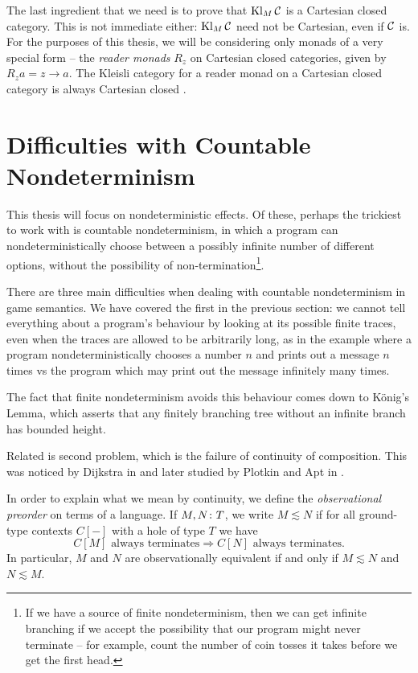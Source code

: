 The last ingredient that we need is to prove that $\operatorname{Kl}_M{\mathcal{C}}$ is a Cartesian closed category.  
This is not immediate either: $\operatorname{Kl}_M{\mathcal{C}}$ need not be Cartesian, even if ${\mathcal{C}}$ is.  
For the purposes of this thesis, we will be considering only monads of a very special form -- the \emph{reader monads} $R_z$ on Cartesian closed categories, given by $R_za = z \to a$.
The Kleisli category for a reader monad on a Cartesian closed category is always Cartesian closed \cite{FunctionalCompleteness}.

\section{Difficulties with Countable Nondeterminism}

This thesis will focus on nondeterministic effects.  
Of these, perhaps the trickiest to work with is countable nondeterminism, in which a program can nondeterministically choose between a possibly infinite number of different options, without the possibility of non-termination\footnote{If we have a source of finite nondeterminism, then we can get infinite branching if we accept the possibility that our program might never terminate -- for example, count the number of coin tosses it takes before we get the first head.}.

There are three main difficulties when dealing with countable nondeterminism in game semantics.  
We have covered the first in the previous section: we cannot tell everything about a program's behaviour by looking at its possible finite traces, even when the traces are allowed to be arbitrarily long, as in the example where a program nondeterministically chooses a number $n$ and prints out a message $n$ times vs the program which may print out the message infinitely many times.  

The fact that finite nondeterminism avoids this behaviour comes down to K\"{o}nig's Lemma, which asserts that any finitely branching tree without an infinite branch has bounded height.  

Related is second problem, which is the failure of continuity of composition.  
This was noticed by Dijkstra in \cite[Ch.~9]{DijkstraBook} and later studied by Plotkin and Apt in \cite{PlotkinApt}.

In order to explain what we mean by continuity, we define the \emph{observational preorder} on terms of a language.  
If $M,N\colon T$, we write $M\lesssim N$ if for all ground-type contexts $C[-]$ with a hole of type $T$ we have
\[
  C[M]\text{ always terminates} \Rightarrow C[N]\text{ always terminates.}
  \]
In particular, $M$ and $N$ are observationally equivalent if and only if $M\lesssim N$ and $N \lesssim M$.

